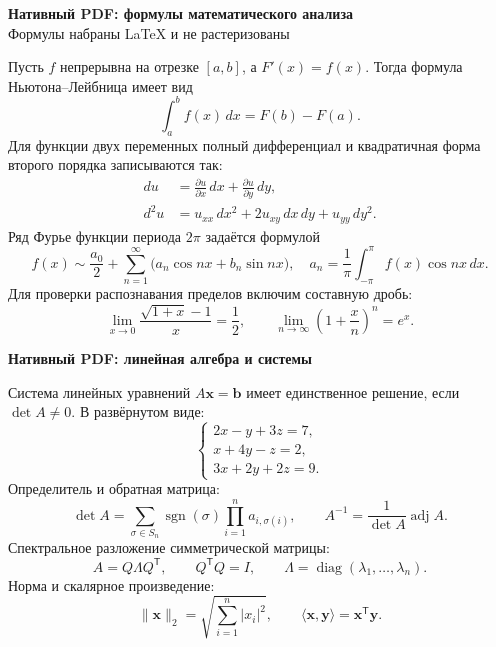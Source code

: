 \documentclass[11pt,a4paper]{article}
\begin{document}
\begin{center}
{\Large\bfseries Нативный PDF: формулы математического анализа}\\[4pt]
{\small Формулы набраны LaTeX и не растеризованы}
\end{center}

Пусть $f$ непрерывна на отрезке $[a,b]$, а $F'(x)=f(x)$. Тогда формула Ньютона--Лейбница имеет вид
\begin{equation}
  \int_a^b f(x)\,dx = F(b)-F(a).
  \tag{N.1}
\end{equation}
Для функции двух переменных полный дифференциал и квадратичная форма второго порядка записываются так:
\begin{align}
  du &= \frac{\partial u}{\partial x}\,dx + \frac{\partial u}{\partial y}\,dy, \tag{N.2}\\
  d^2u &= u_{xx}\,dx^2 + 2u_{xy}\,dx\,dy + u_{yy}\,dy^2. \tag{N.3}
\end{align}
Ряд Фурье функции периода $2\pi$ задаётся формулой
\begin{equation}
 f(x) \sim \frac{a_0}{2}+\sum_{n=1}^{\infty}\bigl(a_n\cos nx+b_n\sin nx\bigr),
 \quad a_n=\frac{1}{\pi}\int_{-\pi}^{\pi}f(x)\cos nx\,dx.
 \tag{N.4}
\end{equation}
Для проверки распознавания пределов включим составную дробь:
\begin{equation}
 \lim_{x\to0}\frac{\sqrt{1+x}-1}{x}=\frac12,
 \qquad
 \lim_{n\to\infty}\left(1+\frac{x}{n}\right)^n=e^x.
 \tag{N.5}
\end{equation}

\newpage
\begin{center}
{\Large\bfseries Нативный PDF: линейная алгебра и системы}
\end{center}

Система линейных уравнений $A\mathbf{x}=\mathbf{b}$ имеет единственное решение, если $\det A\ne0$. В развёрнутом виде:
\begin{equation}
\begin{cases}
  2x-y+3z=7,\\
  x+4y-z=2,\\
  3x+2y+2z=9.
\end{cases}
\tag{N.6}
\end{equation}
Определитель и обратная матрица:
\begin{equation}
 \det A=\sum_{\sigma\in S_n}\operatorname{sgn}(\sigma)
 \prod_{i=1}^{n}a_{i,\sigma(i)},
 \qquad A^{-1}=\frac{1}{\det A}\operatorname{adj}A.
 \tag{N.7}
\end{equation}
Спектральное разложение симметрической матрицы:
\begin{equation}
 A=Q\Lambda Q^{\mathsf T},\qquad Q^{\mathsf T}Q=I,
 \qquad \Lambda=\operatorname{diag}(\lambda_1,\ldots,\lambda_n).
 \tag{N.8}
\end{equation}
Норма и скалярное произведение:
\begin{equation}
 \|\mathbf{x}\|_2=\sqrt{\sum_{i=1}^{n}|x_i|^2},
 \qquad \langle\mathbf{x},\mathbf{y}\rangle=\mathbf{x}^{\mathsf T}\mathbf{y}.
 \tag{N.9}
\end{equation}
\end{document}
